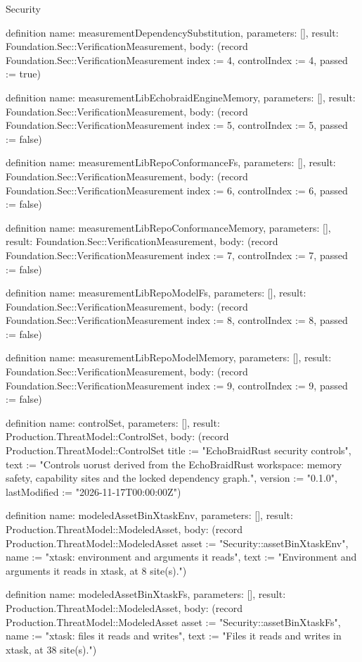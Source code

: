 \begin{lexlean}{Security}
\begin{semanticmodule}
definition{
  name: measurementDependencySubstitution,
  parameters: [],
  result: Foundation.Sec::VerificationMeasurement,
  body: (record Foundation.Sec::VerificationMeasurement {index := 4, controlIndex := 4, passed := true})
}

definition{
  name: measurementLibEchobraidEngineMemory,
  parameters: [],
  result: Foundation.Sec::VerificationMeasurement,
  body: (record Foundation.Sec::VerificationMeasurement {index := 5, controlIndex := 5, passed := false})
}

definition{
  name: measurementLibRepoConformanceFs,
  parameters: [],
  result: Foundation.Sec::VerificationMeasurement,
  body: (record Foundation.Sec::VerificationMeasurement {index := 6, controlIndex := 6, passed := false})
}

definition{
  name: measurementLibRepoConformanceMemory,
  parameters: [],
  result: Foundation.Sec::VerificationMeasurement,
  body: (record Foundation.Sec::VerificationMeasurement {index := 7, controlIndex := 7, passed := false})
}

definition{
  name: measurementLibRepoModelFs,
  parameters: [],
  result: Foundation.Sec::VerificationMeasurement,
  body: (record Foundation.Sec::VerificationMeasurement {index := 8, controlIndex := 8, passed := false})
}

definition{
  name: measurementLibRepoModelMemory,
  parameters: [],
  result: Foundation.Sec::VerificationMeasurement,
  body: (record Foundation.Sec::VerificationMeasurement {index := 9, controlIndex := 9, passed := false})
}

definition{
  name: controlSet,
  parameters: [],
  result: Production.ThreatModel::ControlSet,
  body: (record Production.ThreatModel::ControlSet {title := "EchoBraidRust security controls", text := "Controls uorust derived from the EchoBraidRust workspace: memory safety, capability sites and the locked dependency graph.", version := "0.1.0", lastModified := "2026-11-17T00:00:00Z"})
}

definition{
  name: modeledAssetBinXtaskEnv,
  parameters: [],
  result: Production.ThreatModel::ModeledAsset,
  body: (record Production.ThreatModel::ModeledAsset {asset := "Security::assetBinXtaskEnv", name := "xtask: environment and arguments it reads", text := "Environment and arguments it reads in xtask, at 8 site(s)."})
}

definition{
  name: modeledAssetBinXtaskFs,
  parameters: [],
  result: Production.ThreatModel::ModeledAsset,
  body: (record Production.ThreatModel::ModeledAsset {asset := "Security::assetBinXtaskFs", name := "xtask: files it reads and writes", text := "Files it reads and writes in xtask, at 38 site(s)."})
}


\end{semanticmodule}
\end{lexlean}
